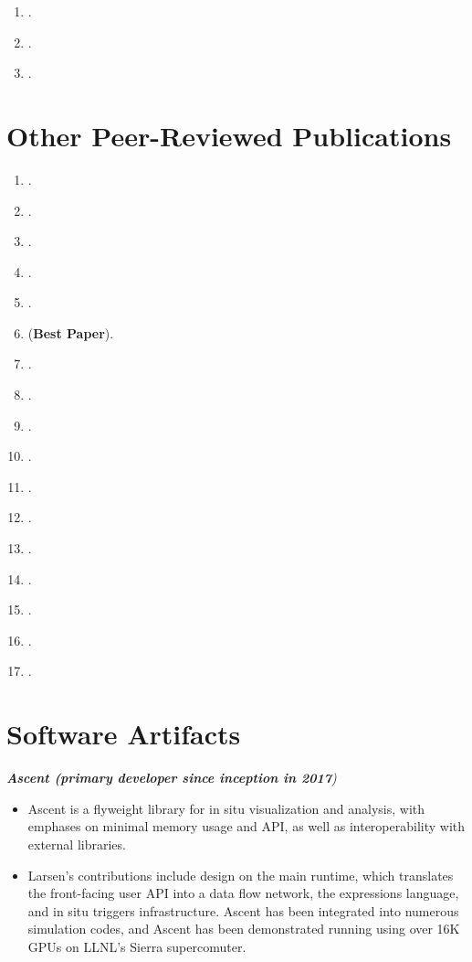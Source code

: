\documentclass[margin,line]{res}
\begin{document}
\begin{resume}
\begin{enumerate}
	\item {}.
	\item {}.
	\item {}.


\end{enumerate}
\section{\sc Other Peer-Reviewed Publications}
\begin{enumerate}[resume]
	\item {}.
	\item {}.
	\item {}.
	\item {}.
	\item {}.
	\item {} (\textbf{Best Paper}).
	\item {}.
	\item {}.
	\item {}.
	\item {}.
	\item {}.
	\item {}.
	\item {}.
	\item {}.
	\item {}.
	\item {}.
	\item {}.
\end{enumerate}

\section{\sc Software Artifacts}
{\em \textbf{Ascent (primary developer since inception in 2017}) }
\begin{itemize}
	\item Ascent is a flyweight library for in situ visualization and analysis, with emphases on minimal
	memory usage and API, as well as interoperability with external libraries.
	\item Larsen's contributions include design on the main runtime, which translates the front-facing user API into a data flow network, the expressions language, and in situ triggers infrastructure. Ascent has been integrated into numerous simulation codes, and Ascent has been demonstrated running using over 16K GPUs on LLNL's Sierra supercomuter.
\end{itemize}


\end{resume}
\end{document}

